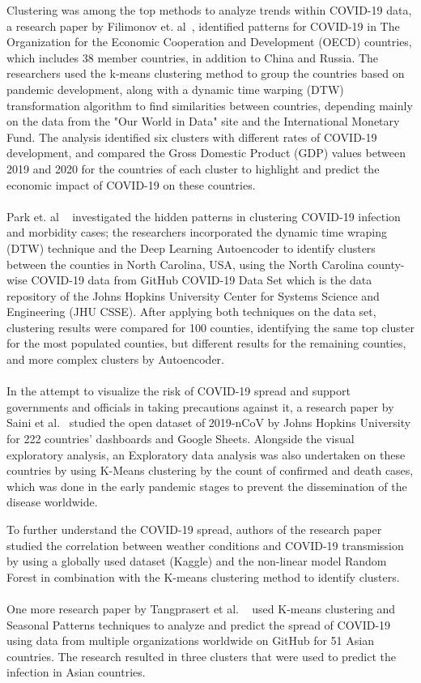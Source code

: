 \documentclass[a4paper]{report}
\begin{document}
Clustering was among the top methods to analyze trends within COVID-19 data, a research paper by Filimonov et. al~\cite{9455073}, identified patterns for COVID-19 in The Organization for the Economic Cooperation and Development (OECD) countries, which includes 38 member countries, in addition to China and Russia. The researchers used the k-means clustering method to group the countries based on pandemic development, along with a dynamic time warping (DTW) transformation algorithm to find similarities between countries, depending mainly on the data from the "Our World in Data" site and the International Monetary Fund. The analysis identified six clusters with different rates of COVID-19 development, and compared the Gross Domestic Product (GDP) values between 2019 and 2020 for the countries of each cluster to highlight and predict the economic impact of COVID-19 on these countries.
\\
\\
Park et. al ~\cite{9457942} investigated the hidden patterns in clustering COVID-19 infection and morbidity cases; the researchers incorporated the dynamic time wraping (DTW) technique and the Deep Learning Autoencoder to identify clusters between the counties in North Carolina, USA, using the North Carolina county-wise COVID-19 data from GitHub COVID-19 Data Set which is the data repository of the Johns Hopkins University Center for Systems Science and Engineering (JHU CSSE). After applying both techniques on the data set, clustering results were compared for 100 counties, identifying the same top cluster for the most populated counties, but different results for the remaining counties, and more complex clusters by Autoencoder.
\\
\\
In the attempt to visualize the risk of COVID-19 spread and support governments and officials in taking precautions against it, a research paper by Saini et al.~\cite{9358331}  studied the open dataset of 2019‐nCoV by Johns Hopkins University for 222 countries' dashboards and Google Sheets. Alongside the visual exploratory analysis, an Exploratory data analysis was also undertaken on these countries by using K-Means clustering by the count of confirmed and death cases, which was done in the early pandemic stages to prevent the dissemination of the disease worldwide.
\newline

To further understand the COVID-19 spread, authors of the research paper ~\cite{9795511} studied the correlation between weather conditions and COVID-19 transmission by using a globally used dataset (Kaggle) and the non-linear model Random Forest in combination with the K-means clustering method to identify clusters. 
\\
\\
One more research paper by Tangprasert et al. ~\cite{tangprasert2023forecasting} used K-means clustering and Seasonal Patterns techniques to analyze and predict the spread of COVID-19 using data from multiple organizations worldwide on GitHub for 51 Asian countries. The research resulted in three clusters that were used to predict the infection in Asian countries.  
\end{document}
